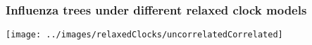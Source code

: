 \begin{frame}
\frametitle{Influenza trees under different relaxed clock models}

\begin{centering}

\texttt{[image: ../images/relaxedClocks/uncorrelatedCorrelated]}

\end{centering}

\end{frame}